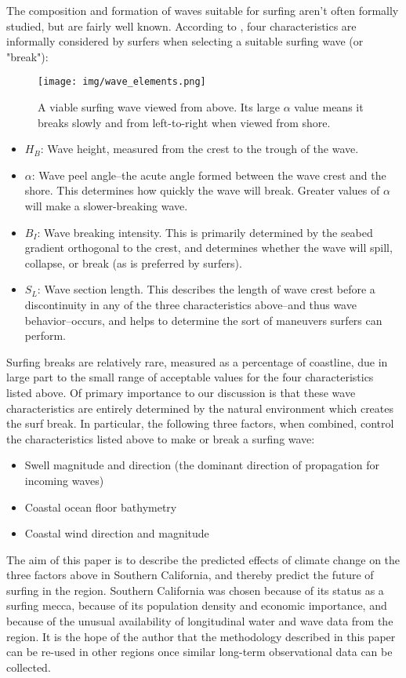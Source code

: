 \documentclass[12pt, letterpaper]{article}
\begin{document}
	The composition and formation of waves suitable for surfing aren't often formally studied, but are fairly well known. According to \citet{surfing-science}, four characteristics are informally considered by surfers when selecting a suitable surfing wave (or "break"): 

	\begin{figure}[h]
		\centering
		\texttt{[image: img/wave\_elements.png]}
		\caption{A viable surfing wave viewed from above. Its large $\alpha$ value means it breaks slowly and from left-to-right when viewed from shore.\citep{surfing-science}}
	\end{figure} 

	\begin{itemize}
		\item $H_B$: Wave height, measured from the crest to the trough of the wave.
		\item $\alpha$: Wave peel angle--the acute angle formed between the wave crest and the shore. This determines how quickly the wave will break. Greater values of $\alpha$ will make a slower-breaking wave.
		\item $B_I$: Wave breaking intensity. This is primarily determined by the seabed gradient orthogonal to the crest, and determines whether the wave will spill, collapse, or break (as is preferred by surfers).
		\item $S_L$: Wave section length. This describes the length of wave crest before a discontinuity in any of the three characteristics above--and thus wave behavior--occurs, and helps to determine the sort of maneuvers surfers can perform.
	\end{itemize}

	Surfing breaks are relatively rare, measured as a percentage of coastline, due in large part to the small range of acceptable values for the four characteristics listed above. Of primary importance to our discussion is that these wave characteristics are entirely determined by the natural environment which creates the surf break. In particular, the following three factors, when combined, control the characteristics listed above to make or break a surfing wave: \citep{surfing-science}
	\begin{itemize}
		\item Swell magnitude and direction (the dominant direction of propagation for incoming waves)
		\item Coastal ocean floor bathymetry
		\item Coastal wind direction and magnitude
	\end{itemize}
	The aim of this paper is to describe the predicted effects of climate change on the three factors above in Southern California, and thereby predict the future of surfing in the region. Southern California was chosen because of its status as a surfing mecca, because of its population density and economic importance, and because of the unusual availability of longitudinal water and wave data from the region. It is the hope of the author that the methodology described in this paper can be re-used in other regions once similar long-term observational data can be collected.
\end{document}
